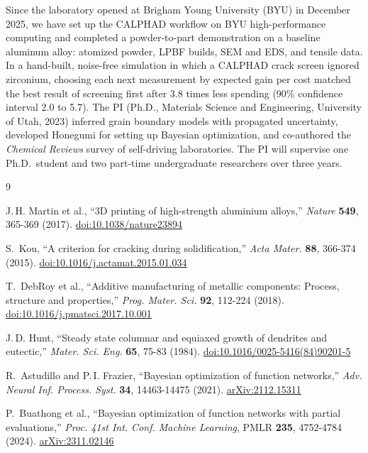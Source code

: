 \documentclass[11pt,letterpaper]{article}
\begin{document}
Since the laboratory opened at Brigham Young University (BYU) in December
2025, we have set up the CALPHAD workflow on BYU high-performance computing
and completed a powder-to-part demonstration on a baseline aluminum alloy:
atomized powder, LPBF builds, SEM and EDS, and tensile data. In a hand-built,
noise-free simulation in which a CALPHAD crack screen ignored zirconium,
choosing each next measurement by expected gain per cost matched the best
result of screening first after 3.8 times less spending (90\% confidence
interval 2.0 to 5.7). The PI (Ph.D., Materials Science and Engineering,
University of Utah, 2023) inferred grain boundary models with propagated
uncertainty, developed Honegumi for setting up Bayesian optimization, and
co-authored the \emph{Chemical Reviews} survey of self-driving laboratories.
The PI will supervise one Ph.D.\ student and two part-time undergraduate
researchers over three years.

\renewcommand{\refname}{References}
\begingroup
\setlength{\itemsep}{0pt}
\raggedright
\begin{thebibliography}{9}
\setlength{\itemsep}{1pt}
\setlength{\parskip}{0pt}

J.\,H. Martin et al., ``3D printing of high-strength aluminium alloys,''
\emph{Nature} \textbf{549}, 365-369 (2017).
\href{https://doi.org/10.1038/nature23894}{doi:10.1038/nature23894}

S.~Kou, ``A criterion for cracking during solidification,'' \emph{Acta
Mater.} \textbf{88}, 366-374 (2015).
\href{https://doi.org/10.1016/j.actamat.2015.01.034}{doi:10.1016/j.actamat.2015.01.034}

T.~DebRoy et al., ``Additive manufacturing of metallic components: Process,
structure and properties,'' \emph{Prog. Mater. Sci.} \textbf{92}, 112-224
(2018).
\href{https://doi.org/10.1016/j.pmatsci.2017.10.001}{doi:10.1016/j.pmatsci.2017.10.001}

J.\,D. Hunt, ``Steady state columnar and equiaxed growth of dendrites and
eutectic,'' \emph{Mater. Sci. Eng.} \textbf{65}, 75-83 (1984).
\href{https://doi.org/10.1016/0025-5416(84)90201-5}{doi:10.1016/0025-5416(84)90201-5}

R.~Astudillo and P.\,I. Frazier, ``Bayesian optimization of function
networks,'' \emph{Adv. Neural Inf. Process. Syst.} \textbf{34}, 14463-14475
(2021). \href{https://arxiv.org/abs/2112.15311}{arXiv:2112.15311}

P.~Buathong et al., ``Bayesian optimization of function networks with partial
evaluations,'' \emph{Proc. 41st Int. Conf. Machine Learning}, PMLR
\textbf{235}, 4752-4784 (2024).
\href{https://arxiv.org/abs/2311.02146}{arXiv:2311.02146}

\end{thebibliography}
\endgroup
\end{document}
